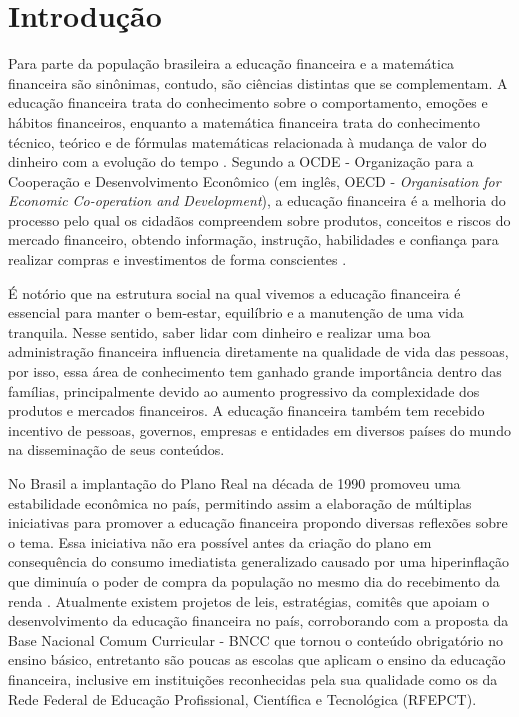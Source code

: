 




\textual
\chapter{Introdução}
Para parte da população brasileira a educação financeira e a matemática financeira são sinônimas, contudo, são ciências distintas que se complementam. A educação financeira trata do conhecimento sobre o comportamento, emoções e hábitos financeiros, enquanto a matemática financeira trata do conhecimento técnico, teórico e de fórmulas matemáticas relacionada à mudança de valor do dinheiro com a evolução do tempo \cite{puccini2011}. Segundo a OCDE - Organização para a Cooperação e Desenvolvimento Econômico (em inglês, OECD - \textit{Organisation for Economic Co-operation and Development}), a educação financeira é a melhoria do processo pelo qual os cidadãos compreendem sobre produtos, conceitos e riscos do mercado financeiro, obtendo informação, instrução, habilidades e confiança para realizar compras e investimentos de forma conscientes \cite{ocde2005}.

É notório que na estrutura social na qual vivemos a educação financeira é essencial para manter o bem-estar, equilíbrio e a manutenção de uma vida tranquila. Nesse sentido, saber lidar com dinheiro e realizar uma boa administração financeira influencia diretamente na qualidade de vida das pessoas, por isso, essa área de conhecimento tem ganhado grande importância dentro das famílias, principalmente devido ao aumento progressivo da complexidade dos produtos e mercados financeiros. A educação financeira também tem recebido incentivo de pessoas, governos, empresas e entidades em diversos países do mundo na disseminação de seus conteúdos.

No Brasil a implantação do Plano Real na década de 1990 promoveu uma estabilidade econômica no país, permitindo assim a elaboração de múltiplas iniciativas para promover a educação financeira propondo diversas reflexões sobre o tema. Essa iniciativa não era possível antes da criação do plano em consequência do consumo imediatista generalizado causado por uma hiperinflação que diminuía o poder de compra da população no mesmo dia do recebimento da renda \cite{souza2016}. Atualmente existem projetos de leis, estratégias, comitês que apoiam o desenvolvimento da educação financeira no país, corroborando com a proposta da Base Nacional Comum Curricular - BNCC que tornou o conteúdo obrigatório no ensino básico, entretanto são poucas as escolas que aplicam o ensino da educação financeira, inclusive em instituições reconhecidas pela sua qualidade como os da Rede Federal de Educação Profissional, Científica e Tecnológica (RFEPCT).

